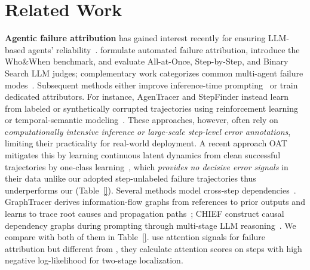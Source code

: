 \section{Related Work}
\label{sec:related}

\textbf{Agentic failure attribution} has gained interest recently for ensuring LLM-based agents' reliability~\citep{qi2026trajdebug,barke2026agentrx}. 
\citet{whoandwhen} formulate automated failure attribution, introduce the
Who\&When benchmark, and evaluate All-at-Once, Step-by-Step, and Binary Search
LLM judges; complementary work categorizes common multi-agent failure
modes~\citep{mast,deshpande2025trail,raj2026model}. Subsequent methods either improve inference-time prompting~\citep{echo,raffles,correct,bakish2026adaptive}
or train dedicated attributors. For instance, AgenTracer and StepFinder instead learn
from labeled or synthetically corrupted trajectories using reinforcement
learning or temporal-semantic modeling~\citep{agentracer,zhu2026stepfinder}. These approaches, however, often rely on c\textit{omputationally intensive inference or large-scale step-level error annotations}, limiting their practicality for real-world deployment. A recent approach OAT mitigates this by
learning continuous latent dynamics from clean successful
trajectories by one-class learning~\citep{oat}, which \textit{provides no decisive error signals} in their data unlike our adopted step-unlabeled failure trajectories thus underperforms our \soap (Table~\ref{}). Several methods model cross-step dependencies~\citep{falat}. GraphTracer derives
information-flow graphs from references to prior outputs and learns to trace
root causes and propagation paths~\citep{graphtracer}; CHIEF construct
causal dependency graphs during prompting through multi-stage LLM reasoning~\citep{chief}. We compare with both of them in Table~\ref{}. \cite{masprism} use attention signals for failure attribution but different from \soap, they calculate attention scores on steps with high negative log-likelihood for two-stage localization.






